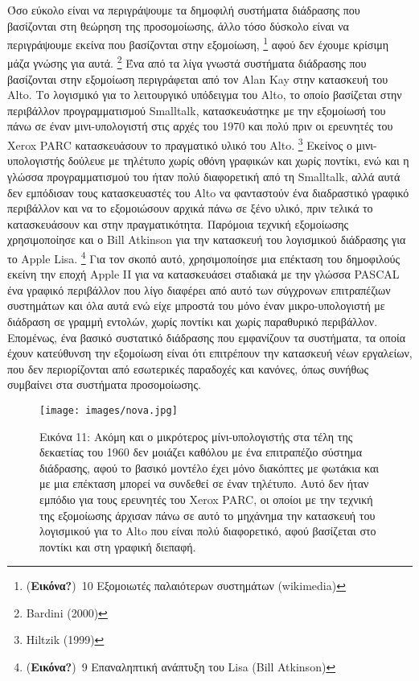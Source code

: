 \documentclass[
]{article}
\begin{document}
Όσο εύκολο είναι να περιγράψουμε τα δημοφιλή συστήματα διάδρασης που
βασίζονται στη θεώρηση της προσομοίωσης, άλλο τόσο δύσκολο είναι να
περιγράψουμε εκείνα που βασίζονται στην εξομοίωση, \footnote{(\textbf{Εικόνα?})~10
  Εξομοιωτές παλαιότερων συστημάτων (wikimedia)} αφού δεν έχουμε κρίσιμη
μάζα γνώσης για αυτά. \footnote{Bardini (2000)} Ένα από τα λίγα γνωστά
συστήματα διάδρασης που βασίζονται στην εξομοίωση περιγράφεται από τον
Alan Kay στην κατασκευή του Alto. Το λογισμικό για το λειτουργικό
υπόδειγμα του Alto, το οποίο βασίζεται στην περιβάλλον προγραμματισμού
Smalltalk, κατασκευάστηκε με την εξομοίωσή του πάνω σε έναν
μινι-υπολογιστή στις αρχές του 1970 και πολύ πριν οι ερευνητές του Xerox
PARC κατασκευάσουν το πραγματικό υλικό του Alto. \footnote{Hiltzik
  (1999)} Εκείνος ο μινι-υπολογιστής δούλευε με τηλέτυπο χωρίς οθόνη
γραφικών και χωρίς ποντίκι, ενώ και η γλώσσα προγραμματισμού του ήταν
πολύ διαφορετική από τη Smalltalk, αλλά αυτά δεν εμπόδισαν τους
κατασκευαστές του Alto να φανταστούν ένα διαδραστικό γραφικό περιβάλλον
και να το εξομοιώσουν αρχικά πάνω σε ξένο υλικό, πριν τελικά το
κατασκευάσουν και στην πραγματικότητα. Παρόμοια τεχνική εξομοίωσης
χρησιμοποίησε και ο Bill Atkinson για την κατασκευή του λογισμικού
διάδρασης για το Apple Lisa. \footnote{(\textbf{Εικόνα?})~9 Επαναληπτική
  ανάπτυξη του Lisa (Bill Atkinson)} Για τον σκοπό αυτό, χρησιμοποίησε
μια επέκταση του δημοφιλούς εκείνη την εποχή Apple II για να
κατασκευάσει σταδιακά με την γλώσσα PASCAL ένα γραφικό περιβάλλον που
λίγο διαφέρει από αυτό των σύγχρονων επιτραπέζιων συστημάτων και όλα
αυτά ενώ είχε μπροστά του μόνο έναν μικρο-υπολογιστή με διάδραση σε
γραμμή εντολών, χωρίς ποντίκι και χωρίς παραθυρικό περιβάλλον. Επομένως,
ένα βασικό συστατικό διάδρασης που εμφανίζουν τα συστήματα, τα οποία
έχουν κατεύθυνση την εξομοίωση είναι ότι επιτρέπουν την κατασκευή νέων
εργαλείων, που δεν περιορίζονται από εσωτερικές παραδοχές και κανόνες,
όπως συνήθως συμβαίνει στα συστήματα προσομοίωσης.

\leavevmode{}%
\begin{figure}
\hypertarget{fig:nova}{%
\centering
\texttt{[image: images/nova.jpg]}
\caption{Εικόνα 11: Ακόμη και ο μικρότερος μίνι-υπολογιστής στα τέλη της
δεκαετίας του 1960 δεν μοιάζει καθόλου με ένα επιτραπέζιο σύστημα
διάδρασης, αφού το βασικό μοντέλο έχει μόνο διακόπτες με φωτάκια και με
μια επέκταση μπορεί να συνδεθεί σε έναν τηλέτυπο. Αυτό δεν ήταν εμπόδιο
για τους ερευνητές του Xerox PARC, οι οποίοι με την τεχνική της
εξομοίωσης άρχισαν πάνω σε αυτό το μηχάνημα την κατασκευή του λογισμικού
για το Alto που είναι πολύ διαφορετικό, αφού βασίζεται στο ποντίκι και
στη γραφική διεπαφή.}\label{fig:nova}
}
\end{figure}
\end{document}

